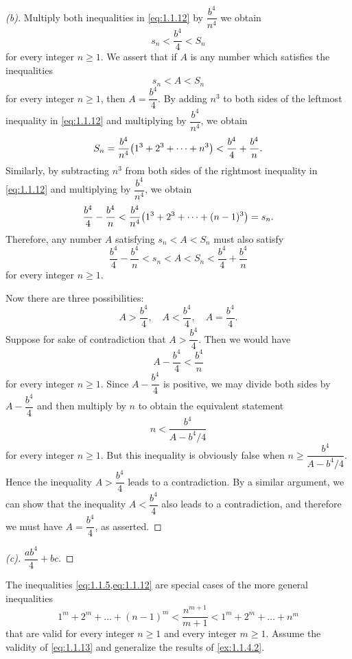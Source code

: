 \begin{proof}[(b)]
  Multiply both inequalities in \cref{eq:1.1.12} by \(\dfrac{b^4}{n^4}\) we obtain
  \[
    s_n < \dfrac{b^4}{4} < S_n
  \]
  for every integer \(n \geq 1\).
  We assert that if \(A\) is any number which satisfies the inequalities
  \[
    s_n < A < S_n
  \]
  for every integer \(n \geq 1\), then \(A = \dfrac{b^4}{4}\).
  By adding \(n^3\) to both sides of the leftmost inequality in \cref{eq:1.1.12} and multiplying by \(\dfrac{b^4}{n^4}\), we obtain
  \[
    S_n = \dfrac{b^4}{n^4} \pa{1^3 + 2^3 + \dots + n^3} < \dfrac{b^4}{4} + \dfrac{b^4}{n}.
  \]
  Similarly, by subtracting \(n^3\) from both sides of the rightmost inequality in \cref{eq:1.1.12} and multiplying by \(\dfrac{b^4}{n^4}\), we obtain
  \[
    \dfrac{b^4}{4} - \dfrac{b^4}{n} < \dfrac{b^4}{n^4} \pa{1^3 + 2^3 + \dots + (n - 1)^3} = s_n.
  \]
  Therefore, any number \(A\) satisfying \(s_n < A < S_n\) must also satisfy
  \[
    \dfrac{b^4}{4} - \dfrac{b^4}{n} < s_n < A < S_n < \dfrac{b^4}{4} + \dfrac{b^4}{n}
  \]
  for every integer \(n \geq 1\).

  Now there are three possibilities:
  \[
    A > \dfrac{b^4}{4}, \quad A < \dfrac{b^4}{4}, \quad A = \dfrac{b^4}{4}.
  \]
  Suppose for sake of contradiction that \(A > \dfrac{b^4}{4}\).
  Then we would have
  \[
    A - \dfrac{b^4}{4} < \dfrac{b^4}{n}
  \]
  for every integer \(n \geq 1\).
  Since \(A - \dfrac{b^4}{4}\) is positive, we may divide both sides by \(A - \dfrac{b^4}{4}\) and then multiply by \(n\) to obtain the equivalent statement
  \[
    n < \dfrac{b^4}{A - b^4 / 4}
  \]
  for every integer \(n \geq 1\).
  But this inequality is obviously false when \(n \geq \dfrac{b^4}{A - b^4 / 4}\).
  Hence the inequality \(A > \dfrac{b^4}{4}\) leads to a contradiction.
  By a similar argument, we can show that the inequality \(A < \dfrac{b^4}{4}\) also leads to a contradiction, and therefore we must have \(A = \dfrac{b^4}{4}\), as asserted.
\end{proof}

\begin{proof}[(c)]
  \(\dfrac{a b^4}{4} + bc\).
\end{proof}

\begin{ex}\label{ex:1.1.4.3}
  The inequalities \cref{eq:1.1.5,eq:1.1.12} are special cases of the more general inequalities
  \begin{equation}\label{eq:1.1.13}
    1^m + 2^m + \dots + (n - 1)^m < \dfrac{n^{m + 1}}{m + 1} < 1^m + 2^m + \dots + n^m
  \end{equation}
  that are valid for every integer \(n \geq 1\) and every integer \(m \geq 1\).
  Assume the validity of \cref{eq:1.1.13} and generalize the results of \cref{ex:1.1.4.2}.
\end{ex}

